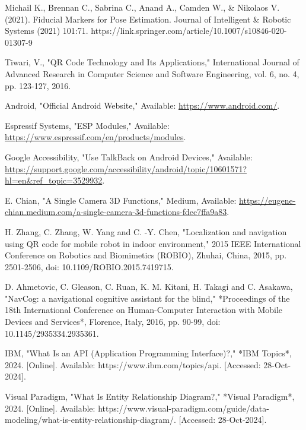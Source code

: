 
\newpage
{}
\renewcommand{\bibname}{References}

\begin{thebibliography}{9}
	Michail K., Brennan C., Sabrina C., Anand A., Camden W., \& Nikolaos
	V. (2021). Fiducial Markers for Pose Estimation. Journal of Intelligent \&
	Robotic Systems (2021) 101:71.
	https://link.springer.com/article/10.1007/s10846-020-01307-9
		
	 Tiwari, V., "QR Code Technology and Its Applications," International Journal of Advanced Research in Computer Science and Software Engineering, vol. 6, no. 4, pp. 123-127, 2016.
	
	Android, "Official Android Website," Available: \url{https://www.android.com/}.
	
	
	Espressif Systems, "ESP Modules," Available: \url{https://www.espressif.com/en/products/modules}.
	
	Google Accessibility, "Use TalkBack on Android Devices," Available: \url{https://support.google.com/accessibility/android/topic/10601571?hl=en&ref_topic=3529932}.
	
	E. Chian, "A Single Camera 3D Functions," Medium, Available: \url{https://eugene-chian.medium.com/a-single-camera-3d-functions-fdec7ffa9a83}.
	
	
	
	
	H. Zhang, C. Zhang, W. Yang and C. -Y. Chen, "Localization and navigation using QR code for mobile robot in indoor environment," 2015 IEEE International Conference on Robotics and Biomimetics (ROBIO), Zhuhai, China, 2015, pp. 2501-2506, doi: 10.1109/ROBIO.2015.7419715.
	
	D. Ahmetovic, C. Gleason, C. Ruan, K. M. Kitani, H. Takagi and C. Asakawa, "NavCog: a navigational cognitive assistant for the blind," *Proceedings of the 18th International Conference on Human-Computer Interaction with Mobile Devices and Services*, Florence, Italy, 2016, pp. 90-99, doi: 10.1145/2935334.2935361.
	
	IBM, "What Is an API (Application Programming Interface)?," *IBM Topics*, 2024. [Online]. Available: https://www.ibm.com/topics/api. [Accessed: 28-Oct-2024].
	
	Visual Paradigm, "What Is Entity Relationship Diagram?," *Visual Paradigm*, 2024. [Online]. Available: https://www.visual-paradigm.com/guide/data-modeling/what-is-entity-relationship-diagram/. [Accessed: 28-Oct-2024].
	


\end{thebibliography}
